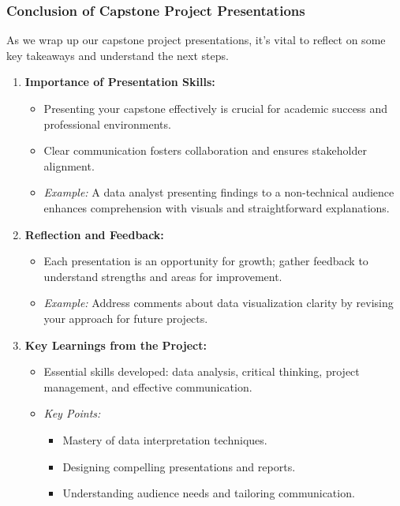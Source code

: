 \documentclass{beamer}
\begin{document}
\begin{frame}[fragile]
    \frametitle{Conclusion of Capstone Project Presentations}
    As we wrap up our capstone project presentations, it’s vital to reflect on some key takeaways and understand the next steps.
    
    \begin{enumerate}
        \item \textbf{Importance of Presentation Skills:}
        \begin{itemize}
            \item Presenting your capstone effectively is crucial for academic success and professional environments.
            \item Clear communication fosters collaboration and ensures stakeholder alignment.
            \item \textit{Example:} A data analyst presenting findings to a non-technical audience enhances comprehension with visuals and straightforward explanations.
        \end{itemize}
        
        \item \textbf{Reflection and Feedback:}
        \begin{itemize}
            \item Each presentation is an opportunity for growth; gather feedback to understand strengths and areas for improvement.
            \item \textit{Example:} Address comments about data visualization clarity by revising your approach for future projects.
        \end{itemize}
        
        \item \textbf{Key Learnings from the Project:}
        \begin{itemize}
            \item Essential skills developed: data analysis, critical thinking, project management, and effective communication.
            \item \textit{Key Points:}
            \begin{itemize}
                \item Mastery of data interpretation techniques.
                \item Designing compelling presentations and reports.
                \item Understanding audience needs and tailoring communication.
            \end{itemize}
        \end{itemize}
    \end{enumerate}
\end{frame}
\end{document}
